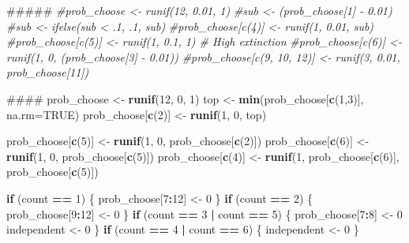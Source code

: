 \documentclass[]{book}
\newenvironment{Shaded}{\begin{snugshade}}{\end{snugshade}}
\newcommand{\KeywordTok}[1]{\textcolor[rgb]{0.13,0.29,0.53}{\textbf{{#1}}}}
\newcommand{\DataTypeTok}[1]{\textcolor[rgb]{0.13,0.29,0.53}{{#1}}}
\newcommand{\DecValTok}[1]{\textcolor[rgb]{0.00,0.00,0.81}{{#1}}}
\newcommand{\StringTok}[1]{\textcolor[rgb]{0.31,0.60,0.02}{{#1}}}
\newcommand{\CommentTok}[1]{\textcolor[rgb]{0.56,0.35,0.01}{\textit{{#1}}}}
\newcommand{\OtherTok}[1]{\textcolor[rgb]{0.56,0.35,0.01}{{#1}}}
\newcommand{\ControlFlowTok}[1]{\textcolor[rgb]{0.13,0.29,0.53}{\textbf{{#1}}}}
\newcommand{\OperatorTok}[1]{\textcolor[rgb]{0.81,0.36,0.00}{\textbf{{#1}}}}
\newcommand{\NormalTok}[1]{{#1}}
\theoremstyle{definition}
\theoremstyle{definition}
\theoremstyle{definition}
\theoremstyle{remark}
\begin{document}
\begin{Shaded}
\begin{Highlighting}[]
\NormalTok{    #####}
    \CommentTok{#prob_choose <- runif(12, 0.01, 1)}
    \CommentTok{#sub <- (prob_choose[1] - 0.01)}
    \CommentTok{#sub <- ifelse(sub < .1, .1, sub)}
    \CommentTok{#prob_choose[c(4)] <- runif(1, 0.01, sub)}
    \CommentTok{#prob_choose[c(5)] <- runif(1, 0.1, 1) # High extinction}
    \CommentTok{#prob_choose[c(6)] <- runif(1, 0, (prob_choose[3] - 0.01))}
    \CommentTok{#prob_choose[c(9, 10, 12)] <- runif(3, 0.01, prob_choose[11])}
    
\NormalTok{    ####}
\NormalTok{    prob_choose <-}\StringTok{ }\KeywordTok{runif}\NormalTok{(}\DecValTok{12}\NormalTok{, }\DecValTok{0}\NormalTok{, }\DecValTok{1}\NormalTok{)}
\NormalTok{    top <-}\StringTok{ }\KeywordTok{min}\NormalTok{(prob_choose[}\KeywordTok{c}\NormalTok{(}\DecValTok{1}\NormalTok{,}\DecValTok{3}\NormalTok{)], }\DataTypeTok{na.rm=}\OtherTok{TRUE}\NormalTok{)}
\NormalTok{    prob_choose[}\KeywordTok{c}\NormalTok{(}\DecValTok{2}\NormalTok{)] <-}\StringTok{ }\KeywordTok{runif}\NormalTok{(}\DecValTok{1}\NormalTok{, }\DecValTok{0}\NormalTok{, top)}
    
\NormalTok{    prob_choose[}\KeywordTok{c}\NormalTok{(}\DecValTok{5}\NormalTok{)] <-}\StringTok{ }\KeywordTok{runif}\NormalTok{(}\DecValTok{1}\NormalTok{, }\DecValTok{0}\NormalTok{, prob_choose[}\KeywordTok{c}\NormalTok{(}\DecValTok{2}\NormalTok{)]) }
\NormalTok{    prob_choose[}\KeywordTok{c}\NormalTok{(}\DecValTok{6}\NormalTok{)] <-}\StringTok{ }\KeywordTok{runif}\NormalTok{(}\DecValTok{1}\NormalTok{, }\DecValTok{0}\NormalTok{, prob_choose[}\KeywordTok{c}\NormalTok{(}\DecValTok{5}\NormalTok{)])}
\NormalTok{    prob_choose[}\KeywordTok{c}\NormalTok{(}\DecValTok{4}\NormalTok{)] <-}\StringTok{ }\KeywordTok{runif}\NormalTok{(}\DecValTok{1}\NormalTok{, prob_choose[}\KeywordTok{c}\NormalTok{(}\DecValTok{6}\NormalTok{)], prob_choose[}\KeywordTok{c}\NormalTok{(}\DecValTok{5}\NormalTok{)])}
    
        
    \ControlFlowTok{if}\NormalTok{ (count }\OperatorTok{==}\StringTok{ }\DecValTok{1}\NormalTok{) \{}
\NormalTok{      prob_choose[}\DecValTok{7}\OperatorTok{:}\DecValTok{12}\NormalTok{] <-}\StringTok{ }\DecValTok{0}
\NormalTok{    \}}
    \ControlFlowTok{if}\NormalTok{ (count }\OperatorTok{==}\StringTok{ }\DecValTok{2}\NormalTok{) \{}
\NormalTok{      prob_choose[}\DecValTok{9}\OperatorTok{:}\DecValTok{12}\NormalTok{] <-}\StringTok{ }\DecValTok{0}
\NormalTok{    \}}
    \ControlFlowTok{if}\NormalTok{ (count }\OperatorTok{==}\StringTok{ }\DecValTok{3} \OperatorTok{|}\StringTok{ }\NormalTok{count }\OperatorTok{==}\StringTok{ }\DecValTok{5}\NormalTok{) \{}
\NormalTok{      prob_choose[}\DecValTok{7}\OperatorTok{:}\DecValTok{8}\NormalTok{] <-}\StringTok{ }\DecValTok{0}
\NormalTok{      independent <-}\StringTok{ }\DecValTok{0}
\NormalTok{    \}}
    \ControlFlowTok{if}\NormalTok{ (count }\OperatorTok{==}\StringTok{ }\DecValTok{4} \OperatorTok{|}\StringTok{ }\NormalTok{count }\OperatorTok{==}\StringTok{ }\DecValTok{6}\NormalTok{) \{}
\NormalTok{      independent <-}\StringTok{ }\DecValTok{0}
\NormalTok{    \}}
    

\end{Highlighting}
\end{Shaded}
\end{document}
